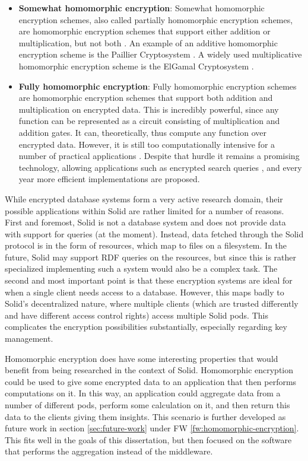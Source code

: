 \begin{itemize}
    \item \textbf{Somewhat homomorphic encryption}: Somewhat homomorphic encryption schemes, also called partially homomorphic encryption schemes, are homomorphic encryption schemes that support either addition or multiplication, but not both \citep{she}. An example of an additive homomorphic encryption scheme is the Paillier Cryptosystem \citep{paillier}. A widely used multiplicative homomorphic encryption scheme is the ElGamal Cryptosystem \citep{elgamal}.
    \item \textbf{Fully homomorphic encryption}: Fully homomorphic encryption schemes are homomorphic encryption schemes that support both addition and multiplication on encrypted data. This is incredibly powerful, since any function can be represented as a circuit consisting of multiplication and addition gates. It can, theoretically, thus compute any function over encrypted data. However, it is still too computationally intensive for a number of practical applications \citep{he-practical, pragmatic-mpc}. Despite that hurdle it remains a promising technology, allowing applications such as encrypted search queries \citep{fhe}, and every year more efficient implementations are proposed.
\end{itemize}

\noindent While encrypted database systems form a very active research domain, their possible applications within Solid are rather limited for a number of reasons. First and foremost, Solid is not a database system and does not provide data with support for queries (at the moment). Instead, data fetched through the Solid protocol is in the form of resources, which map to files on a filesystem. In the future, Solid may support \gls{RDF} queries on the resources, but since this is rather specialized implementing such a system would also be a complex task. The second and most important point is that these encryption systems are ideal for when a single client needs access to a database. However, this maps badly to Solid's decentralized nature, where multiple clients (which are trusted differently and have different access control rights) access multiple Solid pods. This complicates the encryption possibilities substantially, especially regarding key management. 

Homomorphic encryption does have some interesting properties that would benefit from being researched in the context of Solid. Homomorphic encryption could be used to give some encrypted data to an application that then performs computations on it. In this way, an application could aggregate data from a number of different pods, perform some calculation on it, and then return this data to the clients giving them insights. This scenario is further developed as future work in section \ref{sec:future-work} under FW \ref{fw:homomorphic-encryption}. This fits well in the goals of this dissertation, but then focused on the software that performs the aggregation instead of the middleware.

